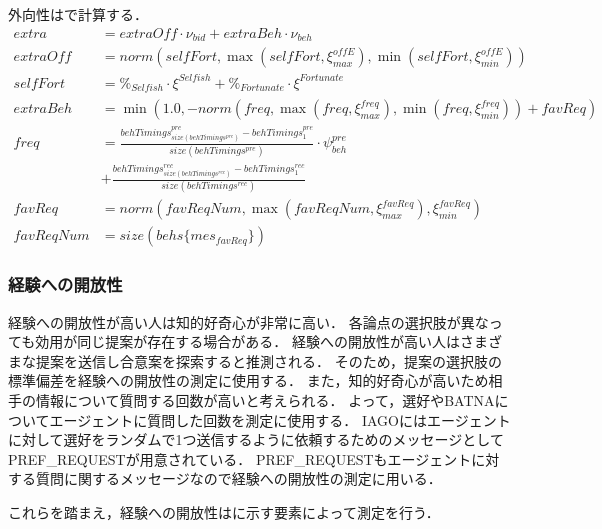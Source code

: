 外向性はで計算する．
\begin{align}
    extra &= \mathit{extraOff} \cdot \nu_{\mathit{bid}} + extraBeh \cdot \nu_{beh} \label{eq:extraversion} \\
    \mathit{extraOff} &= norm\left( \mathit{selfFort}, \max \left( \mathit{selfFort}, \xi_{max}^{\mathit{offE}}\right) , \min \left( \mathit{selfFort}, \xi_{min}^{\mathit{offE}}\right) \right) \nonumber \\
    \mathit{selfFort} &= \%_{\mathit{Selfish}} \cdot \xi^{\mathit{Selfish}} + \%_{Fortunate} \cdot \xi^{\mathit{Fortunate}} \nonumber \\
    extraBeh &= \min \left( 1.0, -norm\left( \mathit{freq}, \max \left( \mathit{freq}, \xi_{max}^{\mathit{freq}}\right), \min\left( \mathit{freq}, \xi_{min}^{\mathit{freq}}\right) \right) + \mathit{favReq}\right) \nonumber \\
    \mathit{freq} &= \frac{behTimings^{pre}_{size(behTimings^{pre})} - behTimings^{pre}_1}{size(behTimings^{pre})} \cdot \psi_{\mathit{beh}}^{pre} \nonumber \\
    &+ \frac{behTimings^{rec}_{size(behTimings^{rec})} - behTimings^{rec}_1}{size(behTimings^{rec})} \nonumber \\
    \mathit{favReq} &= norm\left( \mathit{favReqNum}, \max \left( \mathit{favReqNum}, \xi_{max}^{\mathit{favReq}}\right), \xi_{min}^{\mathit{favReq}} \right) \nonumber \\
    \mathit{favReqNum} &= size(behs\{mes_{\mathit{favReq}}\}) \nonumber
\end{align}

\subsubsection{経験への開放性}
経験への開放性が高い人は知的好奇心が非常に高い．
各論点の選択肢が異なっても効用が同じ提案が存在する場合がある．
経験への開放性が高い人はさまざまな提案を送信し合意案を探索すると推測される．
そのため，提案の選択肢の標準偏差を経験への開放性の測定に使用する．
また，知的好奇心が高いため相手の情報について質問する回数が高いと考えられる．
よって，選好やBATNAについてエージェントに質問した回数を測定に使用する．
IAGOにはエージェントに対して選好をランダムで1つ送信するように依頼するためのメッセージとしてPREF\_REQUESTが用意されている．
PREF\_REQUESTもエージェントに対する質問に関するメッセージなので経験への開放性の測定に用いる．

これらを踏まえ，経験への開放性はに示す要素によって測定を行う．

